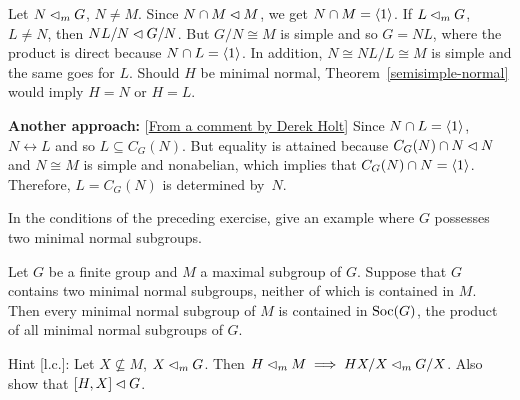 \begin{solution} Let $N\lhd_mG$, $N\ne M$. Since $N\cap M\lhd M$, we get $N\cap M=\langle1\rangle$. If $L\lhd_mG$, $L\ne N$, then $NL/N\lhd G/N$. But $G/N\cong M$ is simple and so $G=NL$, where the product is direct because $N\cap L=\langle1\rangle$. In addition, $N\cong NL/L\cong M$ is simple and the same goes for $L$. Should $H$ be minimal normal, Theorem~\ref{semisimple-normal} would imply $H=N$ or $H=L$. 

{\small \textbf{Another approach:} [\href{https://math.stackexchange.com/a/1188536/269050}{From a comment by Derek Holt}] Since $N\cap L=\langle1\rangle$, $N\leftrightarrow L$ and so $L\subseteq C_G(N)$. But equality is attained because $C_G(N)\cap N\lhd N$ and $N\cong M$ is simple and nonabelian, which implies that $C_G(N)\cap N=\langle1\rangle$. Therefore, $L=C_G(N)$ is determined by~$N$.}

 \end{solution}

\begin{exr}
    In the conditions of the preceding exercise, give an example where\/ $G$ possesses two minimal normal subgroups.
\end{exr}


\begin{exr}
    Let\/ $G$ be a finite group and\/ $M$ a maximal subgroup of\/ $G$. Suppose that\/ $G$ contains two minimal normal subgroups, neither of which is contained in\/ $M$. Then every minimal normal subgroup of\/ $M$ is contained in\/ ${\rm Soc}(G)$, the product of all minimal normal subgroups of\/ $G$.

    \textrm{\rm Hint [l.c.]: Let $X\not\subseteq M$, $X\lhd_m G$. Then $H\lhd_m M\implies HX/X\lhd_mG/X$. Also show that $[H,X]\lhd G$.}
\end{exr}

